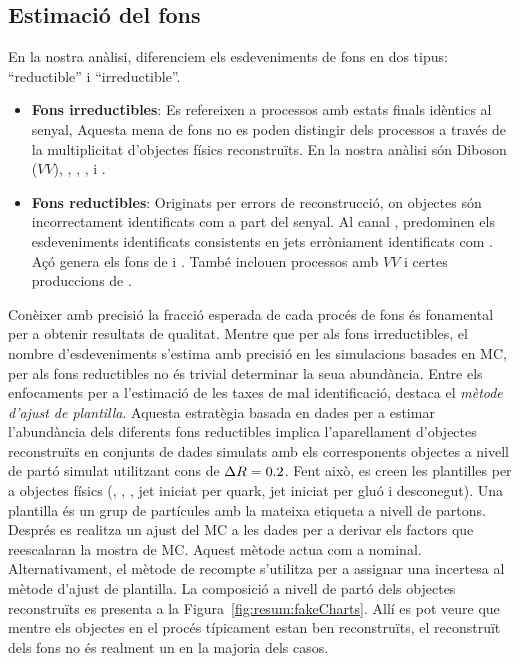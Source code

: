 \subsection{Estimació del fons}
\label{chap:resumen_val:tHq:Fons}
En la nostra anàlisi, diferenciem els esdeveniments de fons en dos tipus: ``reductible'' i ``irreductible''.
\begin{itemize}
	\item \textbf{Fons irreductibles}: Es refereixen a processos amb estats finals idèntics al senyal,
	Aquesta mena de fons no es poden distingir dels processos \tHq a través de la multiplicitat d'objectes físics reconstruïts.
	En la nostra anàlisi són Diboson ($VV$), \tW, \ttZ, \ttH, \ttW i \tZq.
	\item \textbf{Fons reductibles}: Originats per errors de reconstrucció, on objectes són incorrectament identificats
	com a part del senyal. Al canal \dileptau, predominen els esdeveniments identificats consistents en
	jets erròniament identificats com \tauhad. Açó genera els fons de \ttbar i \Zjets. També inclouen processos amb $VV$ i certes produccions de \ttX.
\end{itemize}

Conèixer amb precisió la fracció esperada de cada procés de fons és fonamental per a obtenir resultats de qualitat. 
Mentre que per als fons irreductibles, el nombre d'esdeveniments s'estima amb precisió en les simulacions basades en MC, per als fons reductibles no és trivial determinar la seua abundància. Entre els enfocaments per a l'estimació de les taxes de mal identificació, destaca el \textit{mètode d'ajust de plantilla}. Aquesta estratègia basada en dades per a estimar l'abundància dels diferents fons reductibles implica l'aparellament d'objectes reconstruïts en conjunts de dades simulats amb els corresponents objectes a nivell de partó simulat utilitzant cons de $\Delta R=0.2$. Fent això, es creen les plantilles per a objectes físics (\Pe, \Pmu, \tauhad, jet iniciat per quark, jet iniciat per gluó i desconegut). Una plantilla és un grup de partícules amb la mateixa etiqueta a nivell de partons. Després es realitza un ajust del MC a les dades per a derivar els factors que reescalaran la mostra de MC. Aquest mètode actua com a nominal. Alternativament, el mètode de recompte s'utilitza per a assignar una incertesa al mètode d'ajust de plantilla.
La composició a nivell de partó dels objectes reconstruïts es presenta a la Figura~\ref{fig:resum:fakeCharts}. Allí es pot veure que mentre els objectes en el procés \tHq típicament estan ben reconstruïts, el \tauhad reconstruït dels fons no és realment un \Ptau en la majoria dels casos.



